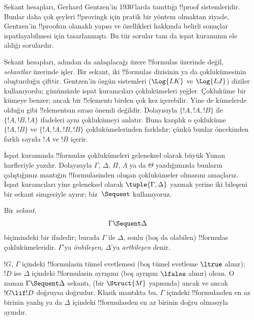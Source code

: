 



Sekant hesapları, Gerhard Gentzen'in 1930'larda tanıttığı !!{proof}
sistemleridir. Bunlar daha çok şeyleri !!{proving}{}k için pratik bir
yöntem olmaktan ziyade, Gentzen'in !!{proof}s{}ın olanaklı yapısı ve özellikleri
hakkında belirli sonuçlar ispatlayabilmesi için tasarlanmıştı. Bu tür sorular
tam da ispat kuramının ele aldığı sorulardır.

Sekant hesapları, adından da anlaşılacağı üzere !!{formula}s üzerinde değil,
\emph{sekantlar} üzerinde işler. Bir sekant, iki !!{formula}s dizisinin ya da
çoklukümesinin oluşturduğu çifttir. Gentzen'in özgün sistemleri ($\Log{LK}$ ve
$\Log{LJ}$) diziler kullanıyordu; günümüzde ispat kuramcıları çoklukümeleri
yeğler. Çokluküme bir kümeye benzer; ancak bir !!{element}{}ı birden çok kez
içerebilir. Yine de kümelerde olduğu gibi !!{element}s{}ın sırası önemli
değildir. Dolayısıyla $\{!A,!A,!B\}$ ile $\{!A,!B,!A\}$ ifadeleri aynı
çoklukümeyi anlatır. Buna karşılık o çokluküme $\{!A,!B\}$ ve
$\{!A,!A,!B,!B\}$ çoklukümelerinden farklıdır; çünkü bunlar öncekinden farklı
sayıda $!A$ ve $!B$ içerir.

İspat kuramında !!{formula}s çoklukümeleri geleneksel olarak büyük Yunan
harfleriyle yazılır. Dolayısıyla $\Gamma$, $\Delta$, $\Pi$, $\Lambda$ ya da
$\Theta$ yazdığımızda bunların çalıştığımız mantığın !!{formula}s{}inden oluşan
çoklukümeler olmasını amaçlarız. İspat kuramcıları yine geleneksel olarak
$\tuple{\Gamma,\Delta}$ yazmak yerine iki bileşeni bir sekant simgesiyle
ayırır; biz~$\Sequent$ kullanıyoruz.

\begin{defn}[Sekant]
Bir \emph{sekant},
\[
\Gamma \Sequent \Delta
\]
biçimindeki bir ifadedir; burada $\Gamma$ ile $\Delta$, sonlu (boş da
olabilen) !!{formula}s çoklukümeleridir. $\Gamma$'ya \emph{önbileşen},
$\Delta$'ya \emph{artbileşen} denir.
\end{defn}

$!G$, $\Gamma$ içindeki !!{formula}s{}in tümel evetlemesi (boş tümel evetleme
$\ltrue$ alınır); $!D$ ise $\Delta$ içindeki !!{formula}s{}in ayrışımı (boş
ayrışım $\lfalse$ alınır) olsun. O zaman $\Gamma \Sequent \Delta$ sekantı,
(bir $\Struct{M}$ yapısında) ancak ve ancak $!G \lif !D$ doğruysa doğrudur.
Klasik mantıkta bu, $\Gamma$ içindeki !!{formula}s{}den en az birinin yanlış ya
da $\Delta$ içindeki !!{formula}s{}den en az birinin doğru olmasıyla aynıdır.

